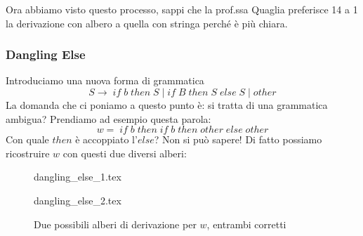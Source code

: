 \documentclass[class=book, crop=false, oneside, 12pt]{standalone}
\begin{document}
Ora abbiamo visto questo processo, sappi che la prof.ssa Quaglia preferisce 14 a 1 la derivazione con albero a quella con stringa perché è più chiara.

\subsubsection*{Dangling Else}
Introduciamo una nuova forma di grammatica
\begin{equation}
    S \to \; if \; b \; then \; S \mid if\; B\; then\; S\; else\; S \mid other
\end{equation}
La domanda che ci poniamo a questo punto è: si tratta di una grammatica ambigua? Prendiamo ad esempio questa parola:
\begin{equation}
    \label{dangling_else}
    w =\; if\; b\; then\; if\; b\; then\; other\; else\; other
\end{equation}
Con quale \(then\) è accoppiato l’\(else\)? Non si può sapere! Di fatto possiamo ricostruire \(w\) con questi due diversi alberi:

\begin{figure}[H]
    \begin{minipage}{.5\textwidth}
        \centering
		{dangling_else_1.tex}
	\end{minipage}
	\begin{minipage}{.5\textwidth}
        \centering
		{dangling_else_2.tex}
    \end{minipage}
    \caption{Due possibili alberi di derivazione per \(w\), entrambi corretti}
    \label{fig:dangling_else}
\end{figure}

\end{document}
